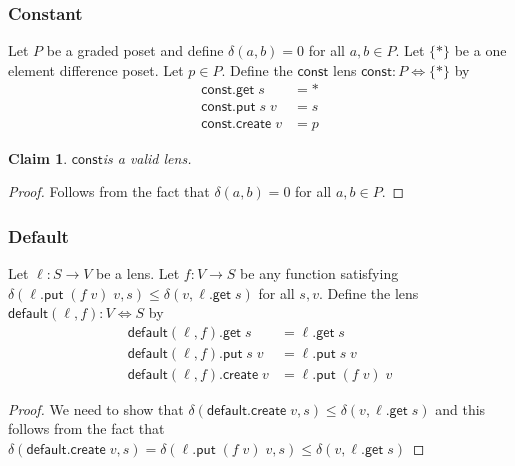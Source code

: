 \documentclass[acmsmall,review,anonymous]{acmart}\settopmatter{printfolios=true,printccs=false,printacmref=false}
\newtheorem{claim}{Claim}
\newcommand{\kw}[1]{\ensuremath{\mathsf{#1}}}
\newcommand{\get}{\ensuremath{\kw{get}}}
\newcommand{\pput}{\ensuremath{\kw{put}}}
\newcommand{\create}{\ensuremath{\kw{create}}}
\newcommand{\const}{\ensuremath{\kw{const}}}
\newcommand{\default}{\ensuremath{\kw{default}}}
\begin{document}
\subsubsection{Constant}
Let $P$ be a graded poset and define $\delta(a, b) = 0$ for all $a, b \in P$.
Let $\{*\}$ be a one element difference poset. Let $p \in P$. Define the \const
lens $\const : P \Leftrightarrow \{*\}$ by
\begin{align*}
\const.\get \; s &= *\\
\const.\pput \; s \; v &= s\\
\const.\create \; v &= p
\end{align*}
\begin{claim}
\const is a valid lens.
\end{claim}
\begin{proof}
Follows from the fact that $\delta(a, b) = 0$ for all $a, b \in P$.
\end{proof}
\subsubsection{Default}
Let $\ell : S \longrightarrow V$ be a lens. Let $f : V \longrightarrow S$ be any
function satisfying $\delta(\ell.\pput \; (f \; v) \; v, s) \leq \delta(v,
\ell.\get \; s)$ for all $s, v$. Define the lens $\default(\ell, f) :
V \Leftrightarrow S$ by
\begin{align*}
\default(\ell, f).\get \; s &= \ell.\get \; s\\
\default(\ell, f).\pput \; s \; v &= \ell.\pput \; s \; v\\
\default(\ell, f).\create \; v &= \ell.\pput \; (f \; v) \; v
\end{align*}
\begin{proof}
We need to show that
$\delta(\default.\create \; v, s) \leq \delta(v,
\ell.\get \; s)$ and this follows from the fact that
$\delta(\default.\create \; v, s) = \delta(\ell.\pput \; (f \; v) \; v, s) \leq
\delta(v, \ell.\get \; s)$
\end{proof}
\end{document}
